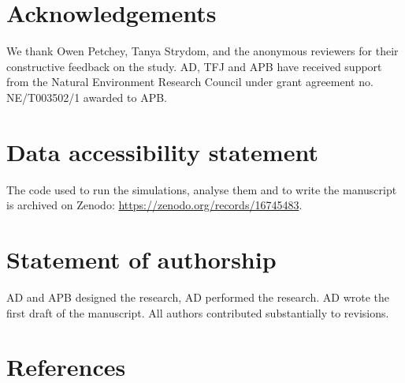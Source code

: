 \documentclass[
]{article}
\begin{document}
\hypertarget{acknowledgements}{%
\section{Acknowledgements}\label{acknowledgements}}

We thank Owen Petchey, Tanya Strydom, and the anonymous reviewers for their
constructive feedback on the study. AD, TFJ and APB have received support from
the Natural Environment Research Council under grant agreement no. NE/T003502/1
awarded to APB.

\hypertarget{data-accessibility-statement}{%
\section{Data accessibility statement}\label{data-accessibility-statement}}

The code used to run the simulations, analyse them and to write the manuscript
is archived on Zenodo: \url{https://zenodo.org/records/16745483}.

\hypertarget{statement-of-authorship}{%
\section{Statement of authorship}\label{statement-of-authorship}}

AD and APB designed the research, AD performed the research. AD wrote the first
draft of the manuscript. All authors contributed substantially to revisions.

\hypertarget{references}{%
\section*{References}\label{references}}
\end{document}
